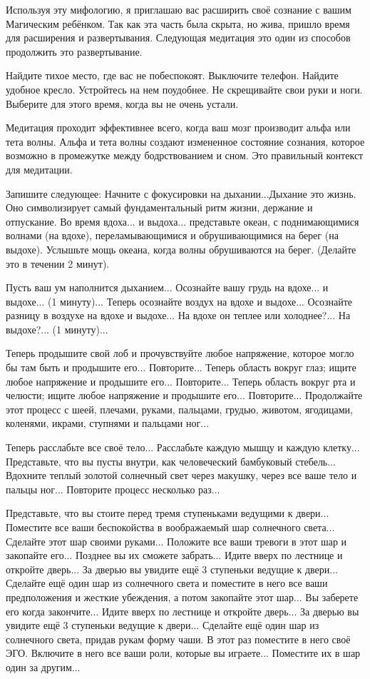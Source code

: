 \documentclass[10pt, fleqn]{article}
\begin{document}
Используя эту мифологию, я приглашаю вас расширить своё сознание с вашим Магическим ребёнком. Так как эта часть была скрыта, но жива, пришло время для расширения и развертывания. Следующая медитация это один из способов продолжить это развертывание.


Найдите тихое место, где вас не побеспокоят. Выключите телефон. Найдите удобное кресло. Устройтесь на нем поудобнее. Не скрещивайте свои руки и ноги. Выберите для этого время, когда вы не очень устали.

Медитация проходит эффективнее всего, когда ваш мозг производит альфа или тета волны. Альфа и тета волны создают измененное состояние сознания, которое возможно в промежутке между бодрствованием и сном. Это правильный контекст для медитации.

Запишите следующее:
Начните с фокусировки на дыхании...Дыхание это жизнь. Оно символизирует самый фундаментальный ритм жизни, держание и отпускание. Во время вдоха... и выдоха... представьте океан, с поднимающимися волнами (на вдохе), переламывающимися и обрушивающимися на берег (на выдохе). Услышьте мощь океана, когда волны обрушиваются на берег. (Делайте это в течении 2 минут).

Пусть ваш ум наполнится дыханием... Осознайте вашу грудь на вдохе... и выдохе... (1 минуту)... Теперь осознайте воздух на вдохе и выдохе... Осознайте разницу в воздухе на вдохе и выдохе... На вдохе он теплее или холоднее?... На выдохе?... (1 минуту)...

Теперь продышите свой лоб и прочувствуйте любое напряжение, которое могло бы там быть и продышите его... Повторите... Теперь область вокруг глаз; ищите любое напряжение и продышите его... Повторите... Теперь область вокруг рта и челюсти; ищите любое напряжение и продышите его... Повторите... Продолжайте этот процесс с шеей, плечами, руками, пальцами, грудью, животом, ягодицами, коленями, икрами, ступнями и пальцами ног...

Теперь расслабьте все своё тело... Расслабьте каждую мышцу и каждую клетку... Представьте, что вы пусты внутри, как человеческий бамбуковый стебель... Вдохните теплый золотой солнечный свет через макушку, через все ваше тело и пальцы ног... Повторите процесс несколько раз...

Представьте, что вы стоите перед тремя ступеньками ведущими к двери... Поместите все ваши беспокойства в воображаемый шар солнечного света... Сделайте этот шар своими руками... Положите все ваши тревоги в этот шар и закопайте его... Позднее вы их сможете забрать... Идите вверх по лестнице и откройте дверь... За дверью вы увидите ещё 3 ступеньки ведущие к двери... Сделайте ещё один шар из солнечного света и поместите в него все ваши предположения и жесткие убеждения, а потом закопайте этот шар... Вы заберете его когда закончите... Идите вверх по лестнице и откройте дверь... За дверью вы увидите ещё 3 ступеньки ведущие к двери... Сделайте ещё один шар из солнечного света, придав рукам форму чаши. В этот раз поместите в него своё ЭГО. Включите в него все ваши роли, которые вы играете... Поместите их в шар один за другим...
\end{document}
